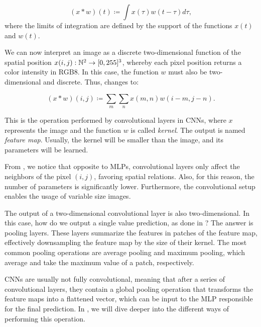 \begin{equation}
    (x\ast w)(t)\coloneqq \int x(\tau)w(t-\tau)d\tau,
    \label{eq:convolution}
\end{equation}
where the limits of integration are defined by the support of the functions $x(t)$ and $w(t)$. 

We can now interpret an image as a discrete two-dimensional function of the spatial position $x(i,j): \mathbb{N}^2\rightarrow [0, 255]^3$, whereby each pixel position returns a color intensity in RGB8. In this case, the function $w$ must also be two-dimensional and discrete. Thus,  changes to:

\begin{equation}
    (x\ast w)(i,j)\coloneqq \sum_m\sum_n x(m,n) w(i-m, j-n).
    \label{eq:convolution_2d}
\end{equation}

This is the operation performed by convolutional layers in CNNs, where $x$ represents the image and the function $w$ is called \textit{kernel}. The output is named \textit{feature map}. Usually, the kernel will be smaller than the image, and its parameters will be learned.

From , we notice that opposite to MLPs, convolutional layers only affect the neighbors of the pixel $(i, j)$, favoring spatial relations. Also, for this reason, the number of parameters is significantly lower. Furthermore, the convolutional setup enables the usage of variable size images. 

The output of a two-dimensional convolutional layer is also two-dimensional. In this case, how do we output a single value prediction, as done in ? The answer is pooling layers. These layers summarize the features in patches of the feature map, effectively downsampling the feature map by the size of their kernel. The most common pooling operations are average pooling and maximum pooling, which average and take the maximum value of a patch, respectively.


CNNs are usually not fully convolutional, meaning that after a series of convolutional layers, they contain a global pooling operation that transforms the feature maps into a flattened vector, which can be input to the MLP responsible for the final prediction. In , we will dive deeper into the different ways of performing this operation. 

